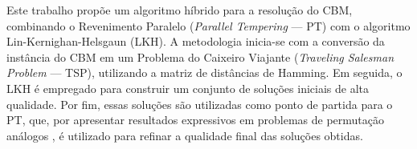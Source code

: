 Este trabalho propõe um algoritmo híbrido para a resolução do CBM, combinando o Revenimento Paralelo (\textit{Parallel Tempering} — PT) com o algoritmo Lin-Kernighan-Helsgaun (LKH). A metodologia inicia-se com a conversão da instância do CBM em um Problema do Caixeiro Viajante (\textit{Traveling Salesman Problem} — TSP), utilizando a matriz de distâncias de Hamming. Em seguida, o LKH é empregado para construir um conjunto de soluções iniciais de alta qualidade. Por fim, essas soluções são utilizadas como ponto de partida para o PT, que, por apresentar resultados expressivos em problemas de permutação análogos \cite{ALMEIDA2025107000}, é utilizado para refinar a qualidade final das soluções obtidas.